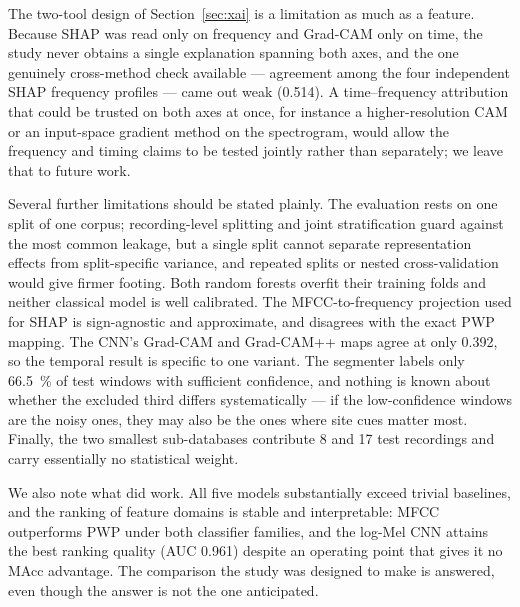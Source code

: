 The two-tool design of Section~\ref{sec:xai} is a limitation as much as a
feature. Because SHAP was read only on frequency and Grad-CAM only on time, the
study never obtains a single explanation spanning both axes, and the one
genuinely cross-method check available --- agreement among the four independent
SHAP frequency profiles --- came out weak (\num{0.514}). A time--frequency
attribution that could be trusted on both axes at once, for instance a
higher-resolution CAM or an input-space gradient method on the spectrogram, would
allow the frequency and timing claims to be tested jointly rather than
separately; we leave that to future work.

Several further limitations should be stated plainly. The evaluation rests on one
split of one corpus; recording-level splitting and joint stratification guard
against the most common leakage, but a single split cannot separate
representation effects from split-specific variance, and repeated splits or
nested cross-validation would give firmer footing. Both random forests overfit
their training folds and neither classical model is well calibrated. The
MFCC-to-frequency projection used for SHAP is sign-agnostic and approximate, and
disagrees with the exact PWP mapping. The CNN's Grad-CAM and Grad-CAM++ maps
agree at only \num{0.392}, so the temporal result is specific to one variant. The
segmenter labels only \SI{66.5}{\percent} of test windows with sufficient
confidence, and nothing is known about whether the excluded third differs
systematically --- if the low-confidence windows are the noisy ones, they may
also be the ones where site cues matter most. Finally, the two smallest
sub-databases contribute 8 and 17 test recordings and carry essentially no
statistical weight.

We also note what did work. All five models substantially exceed trivial
baselines, and the ranking of feature domains is stable and interpretable: MFCC
outperforms PWP under both classifier families, and the log-Mel CNN attains the
best ranking quality (AUC \num{0.961}) despite an operating point that gives it
no MAcc advantage. The comparison the study was designed to make is answered,
even though the answer is not the one anticipated.
